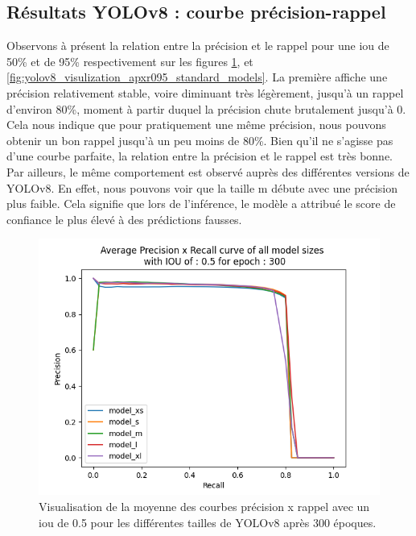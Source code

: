 \clearpage


\subsection{Résultats YOLOv8 : courbe précision-rappel}

Observons à présent la relation entre la précision et le rappel pour une \acrshort{iou} de 50\% et de 95\% respectivement sur les figures \ref{fig:yolov8_visulization_apxr05_standard_models}, et \ref{fig:yolov8_visulization_apxr095_standard_models}. La première affiche une précision relativement stable, voire diminuant très légèrement, jusqu'à un rappel d'environ 80\%, moment à partir duquel la précision chute brutalement jusqu'à 0. Cela nous indique que pour pratiquement une même précision, nous pouvons obtenir un bon rappel jusqu'à un peu moins de 80\%. Bien qu'il ne s'agisse pas d'une courbe parfaite, la relation entre la précision et le rappel est très bonne. Par ailleurs, le même comportement est observé auprès des différentes versions de YOLOv8. En effet, nous pouvons voir que la taille m débute avec une précision plus faible. Cela signifie que lors de l'inférence, le modèle a attribué le score de confiance le plus élevé à des prédictions fausses.

\begin{figure}[hbt!]
    \centering
    \includegraphics[scale=0.7]{Figures/results/yolov8/apxr_05_300.png}
    \caption{Visualisation de la moyenne des courbes précision x rappel avec un \acrshort{iou} de 0.5 pour les différentes tailles de YOLOv8 après 300 époques.}
    \label{fig:yolov8_visulization_apxr05_standard_models}
\end{figure}


